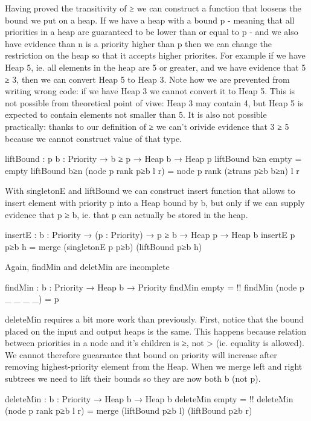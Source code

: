 Having proved the transitivity of ≥ we can construct a function
that loosens the bound we put on a heap. If we have a heap with a
bound p - meaning that all priorities in a heap are guaranteed to
be lower than or equal to p - and we also have evidence than n is a
priority higher than p then we can change the restriction on the
heap so that it accepts higher priorites. For example if we have
Heap 5, ie. all elements in the heap are 5 or greater, and we have
evidence that 5 ≥ 3, then we can convert Heap 5 to Heap 3. Note how
we are prevented from writing wrong code: if we have Heap 3 we
cannot convert it to Heap 5. This is not possible from theoretical
point of viwe: Heap 3 may contain 4, but Heap 5 is expected to
contain elements not smaller than 5. It is also not possible
practically: thanks to our definition of ≥ we can't orivide
evidence that 3 ≥ 5 because we cannot construct value of that type.
\begin{code}
liftBound : {p b : Priority} → b ≥ p → Heap b → Heap p
liftBound b≥n empty = empty
liftBound b≥n (node p rank p≥b l r)
  = node p rank (≥trans p≥b b≥n) l r
\end{code}


With singletonE and liftBound we can construct insert function that
allows to insert element with priority p into a Heap bound by b,
but only if we can supply evidence that p ≥ b, ie. that p can
actually be stored in the heap.
\begin{code}
insertE : {b : Priority} → (p : Priority) → p ≥ b → Heap p → Heap b
insertE p p≥b h = merge (singletonE p p≥b) (liftBound p≥b h)
\end{code}


Again, findMin and deletMin are incomplete
\begin{code}
findMin : {b : Priority} → Heap b → Priority
findMin empty            = {!!}
findMin (node p _ _ _ _) = p
\end{code}


deleteMin requires a bit more work than previously. First, notice
that the bound placed on the input and output heaps is the
same. This happens because relation between priorities in a node
and it's children is ≥, not > (ie. equality is allowed). We cannot
therefore guearantee that bound on priority will increase after
removing highest-priority element from the Heap. When we merge
left and right subtrees we need to lift their bounds so they are
now both b (not p).
\begin{code}
deleteMin : {b : Priority} → Heap b → Heap b
deleteMin empty                 = {!!}
deleteMin (node p rank p≥b l r) = merge (liftBound p≥b l) (liftBound p≥b r)
\end{code}
